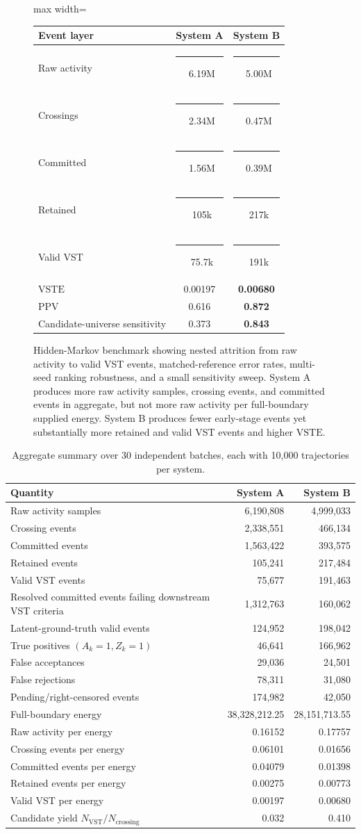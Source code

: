 \documentclass[11pt,a4paper]{article}
\newcommand{\VST}{\ensuremath{\mathrm{VST}}}
\newcommand{\VSTE}{\ensuremath{\mathrm{VSTE}}}
\newcommand{\1}{\mathbf{1}}
\newcommand{\VSTFBar}[2]{\textcolor{#1}{\rule{#2}{0.75em}}}
\newcommand{\VSTFHMMBenchmarkFigure}{%
  \begin{adjustbox}{max width=\linewidth}
  \begin{tabular}{lcc}
  \toprule
  Event layer & System A & System B\\
  \midrule
  Raw activity & \VSTFBar{blue!60}{5.4em}\ 6.19M & \VSTFBar{green!55!black}{4.4em}\ 5.00M\\
  Crossings & \VSTFBar{blue!60}{4.8em}\ 2.34M & \VSTFBar{green!55!black}{1.0em}\ 0.47M\\
  Committed & \VSTFBar{blue!60}{4.0em}\ 1.56M & \VSTFBar{green!55!black}{1.0em}\ 0.39M\\
  Retained & \VSTFBar{blue!60}{1.2em}\ 105k & \VSTFBar{green!55!black}{2.5em}\ 217k\\
  Valid VST & \VSTFBar{blue!60}{0.9em}\ 75.7k & \VSTFBar{green!55!black}{2.3em}\ 191k\\
  \midrule
  \VSTE{} & 0.00197 & \textbf{0.00680}\\
  PPV & 0.616 & \textbf{0.872}\\
  Candidate-universe sensitivity & 0.373 & \textbf{0.843}\\
  \bottomrule
  \end{tabular}
  \end{adjustbox}
}
\begin{document}
\begin{figure}[h]
\centering
\VSTFHMMBenchmarkFigure
\caption{Hidden-Markov benchmark showing nested attrition from raw activity to valid VST events, matched-reference error rates, multi-seed ranking robustness, and a small sensitivity sweep. System A produces more raw activity samples, crossing events, and committed events in aggregate, but not more raw activity per full-boundary supplied energy. System B produces fewer early-stage events yet substantially more retained and valid VST events and higher \VSTE{}.}
\label{fig:hmm-benchmark}
\end{figure}

\begin{table}[h]
\centering
\caption{Aggregate summary over 30 independent batches, each with 10,000 trajectories per system.}
\label{tab:hmm-summary}
\begin{tabular}{lrr}
\toprule
Quantity & System A & System B \\
\midrule
Raw activity samples & 6,190,808 & 4,999,033 \\
Crossing events & 2,338,551 & 466,134 \\
Committed events & 1,563,422 & 393,575 \\
Retained events & 105,241 & 217,484 \\
Valid VST events & 75,677 & 191,463 \\
Resolved committed events failing downstream VST criteria & 1,312,763 & 160,062 \\
Latent-ground-truth valid events & 124,952 & 198,042 \\
True positives $(A_k=1,Z_k=1)$ & 46,641 & 166,962 \\
False acceptances & 29,036 & 24,501 \\
False rejections & 78,311 & 31,080 \\
Pending/right-censored events & 174,982 & 42,050 \\
Full-boundary energy & 38,328,212.25 & 28,151,713.55 \\
Raw activity per energy & 0.16152 & 0.17757 \\
Crossing events per energy & 0.06101 & 0.01656 \\
Committed events per energy & 0.04079 & 0.01398 \\
Retained events per energy & 0.00275 & 0.00773 \\
Valid VST per energy & 0.00197 & 0.00680 \\
Candidate yield $N_{\VST}/N_{\mathrm{crossing}}$ & 0.032 & 0.410 \\

\end{tabular}
\end{table}
\end{document}
